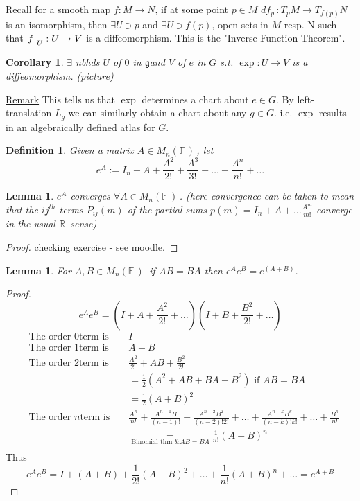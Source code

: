 \documentclass[12pt,a4paper]{article}
\newcommand{\rR}{\ensuremath{\mathbb{R}\,}}
\newcommand{\fF}{\ensuremath{\mathbb{F}\,}}
\newcommand{\tpm}{\ensuremath{T_p M}}
\newcommand{\tqn}[2]{\ensuremath{T_{#1} {#2}}}
\newcommand{\dfp}{\ensuremath{df_p \,}}
\newcommand{\mnf}{\ensuremath{M_n(\fF)\,}}
\newcommand{\lalg}{\ensuremath{\mathfrak{g}}}
\newcommand{\ul}[1]{\underline{#1}}
\newtheorem{defn}[thm]{Definition}
\newtheorem{lemma}[thm]{Lemma}
\newtheorem{cor}[thm]{Corollary}
\begin{document}
Recall for a smooth map $f:M\to N$, if at some point $p\in M$ $\dfp:\tpm\to \tqn{f(p)}{N}$ is an isomorphism, then $\exists U\ni p$ and $\exists U\ni f(p)$, open sets in $M$ resp. N such that $\eval{f}_{U}:U\to V$ is a diffeomorphism. This is the "Inverse Function Theorem".

\begin{cor}
$\exists$ nbhds $U$ of $0$ in \lalg and $V$ of $e$ in $G$ s.t. $\exp:U\to V$ is a diffeomorphism. (picture)
\end{cor}

\ul{Remark} This tells us that $\exp$ determines a chart about $e\in G$. By left-translation $L_g$ we can similarly obtain a chart about any $g\in G$. i.e. $\exp$ results in an algebraically defined atlas for $G$.

\begin{defn}
Given a matrix $A\in\mnf$, let 
\[e^A:=I_n+A+\frac{A^2}{2!}+\frac{A^3}{3!}+\ldots +\frac{A^n}{n!}+\ldots\]
\end{defn}
\begin{lemma}
$e^A$ converges $\forall A\in \mnf$. (here convergence can be taken to mean that the $ij^{th}$ terms $P_{ij}(m)$ of the partial sums $p(m)=I_n+A+\ldots \frac{A^m}{m!}$ converge in the usual $\rR $ sense)
\end{lemma}
\begin{proof}
checking exercise - see moodle.
\end{proof}
\begin{lemma}
For $A,B\in \mnf$ if $AB=BA$ then $e^A e^B=e^(A+B)$.
\end{lemma}
\begin{proof}
\[e^Ae^B=\left(I+A+\frac{A^2}{2!}+\ldots\right)\left(I+B+\frac{B^2}{2!}+\ldots\right)\]
\begin{align*}
&\text{The order }0 \text{term is }&& I\\
&\text{The order }1 \text{term is } &&A+B\\
&\text{The order }2 \text{term is } &&\frac{A^2}{2!}+AB+\frac{B^2}{2!}\\
& &&=\frac{1}{2}(A^2+AB+BA+B^2) \text{ if } AB=BA\\
& &&=\frac{1}{2}(A+B)^2\\
&\text{The order }n \text{term is } &&\frac{A^n}{n!}+\frac{A^{n-1}B}{(n-1)!}+ \frac{A^{n-2}B^2}{(n-2)!2!}+\ldots + \frac{A^{n-k}B^k}{(n-k)!k!}+\ldots +\frac{B^n}{n!}\\
& &&\underset{\text{Binomial thm \&} AB=BA}{=} \frac{1}{n!}(A+B)^n\\
\end{align*}
Thus 
\[e^Ae^B=I+(A+B) +\frac{1}{2!}(A+B)^2+\ldots +\frac{1}{n!}(A+B)^n+\ldots =e^{A+B}\]
\end{proof}
\end{document}
